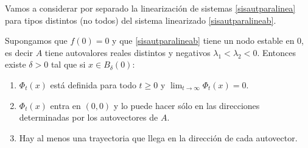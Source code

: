 Vamos a considerar por separado la linearización de sistemas
\eqref{sisautparalinea} para  tipos distintos (no todos) del
sistema linearizado \eqref{sisautparalineab}.

\begin{teorema} Supongamos que $f(0)=0$ y que
\eqref{sisautparalineab} tiene un nodo estable en $0$, es decir
$A$ tiene autovalores reales distintos y negativos
$\lambda_1<\lambda_2<0$. Entonces existe $\delta>0$ tal que si
$x\in B_{\delta}(0)$:
\begin{enumerate}
       \item\label{inc1}  $\Phi_t(x)$ está definida para todo
            $t\geq 0$ y $\lim_{t\to\infty}\Phi_t(x)=0$.
        \item\label{inc2} $\Phi_t(x)$ entra en $(0,0)$ y lo puede hacer sólo en las
                direcciones determinadas por los autovectores de $A$.
        \item\label{inc3}  Hay al menos una trayectoria que llega en la dirección de cada
                autovector.
\end{enumerate}
\end{teorema}
